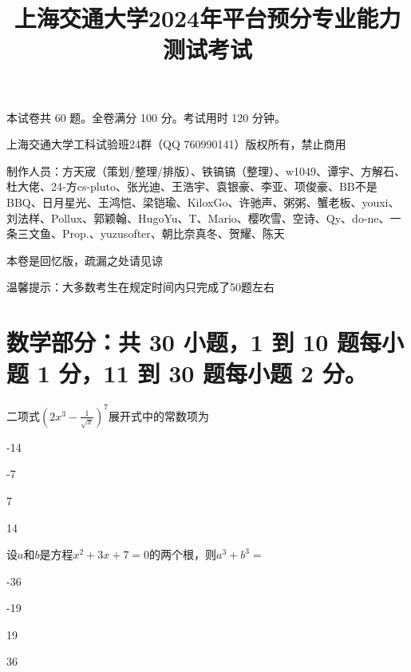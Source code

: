 \documentclass{exam-zh}
\title{上海交通大学2024年平台预分专业能力测试考试}
\begin{document}


\maketitle

本试卷共 60 题。全卷满分 100 分。考试用时 120 分钟。


\begin{notice}
  \item 上海交通大学工科试验班24群（QQ 760990141）版权所有，禁止商用
  \item 制作人员：方天{宬}（策划/整理/排版）、铁镐镐（整理）、w1049、谭宇、方解石、杜大佬、24-方cs-pluto、张光迪、王浩宇、袁银豪、李亚、项俊豪、BB不是BBQ、日月星光、王鸿恺、梁铠瑜、KiloxGo、许驰声、粥粥、蟹老板、youxi、刘法样、Pollux、郭颖翰、HugoYu、T、Mario、樱吹雪、空诗、Qy、do-ne、一条三文鱼、Prop.、yuzusofter、朝比奈真冬、贺耀、陈天
  \item 本卷是回忆版，疏漏之处请见谅
  \item 温馨提示：大多数考生在规定时间内只完成了50题左右
\end{notice}



\section{%
  数学部分：共 30 小题，1 到 10 题每小题 1 分，11 到 30 题每小题 2 分。
}

\begin{question}
  二项式$\left(2x^3-\frac1{\sqrt{x}}\right)^7$展开式中的常数项为 \paren[]

  \begin{choices}
    \item -14
    \item -7
    \item 7
    \item 14
  \end{choices}
\end{question}

\begin{question}
  设$a$和$b$是方程$x^2+3x+7=0$的两个根，则$a^3+b^3=$ \paren

  \begin{choices}
    \item -36
    \item -19
    \item 19
    \item 36
  \end{choices}
\end{question}
\end{document}
